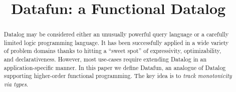 \documentclass[preprint]{sigplanconf}
\begin{document}
\setlength{\pdfpageheight}{\paperheight}
\setlength{\pdfpagewidth}{\paperwidth}





\title{Datafun: a Functional Datalog}
\subtitle{}




\authorinfo{}{}{}


\maketitle


\begin{abstract}
  Datalog may be considered either an unusually powerful query language or a
  carefully limited logic programming language. It has been successfully applied
  in a wide variety of problem domains thanks to hitting a ``sweet spot'' of
  expressivity, optimizability, and declarativeness. However, most use-cases
  require extending Datalog in an application-specific manner. In this paper we
  define Datafun, an analogue of Datalog supporting higher-order functional
  programming. The key idea is to \emph{track monotonicity via types}.

\end{abstract}

%
%
\end{document}
